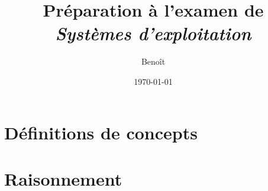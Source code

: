 

\newcommand{\quest}[2]{\textcolor{dkblue}{\textit{#1}}\vspace*{.2cm}\par\hspace*{.5cm}#2}

\newcommand{\vrai}[0]{\textcolor{dkgreen}{Vrai}}
\newcommand{\faux}[0]{\textcolor{dkred}{Faux}}

\author{Benoît}
\title{Préparation à l'examen de \textit{Systèmes d'exploitation}}
\date{\today}





\chapter{Définitions de concepts}

\begin{enumerate}\setlength\itemsep{1em}





\end{enumerate}


\chapter{Raisonnement}
\begin{enumerate}\setlength\itemsep{1em}


\end{enumerate}





